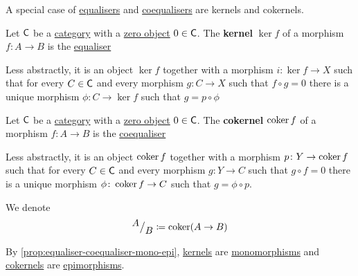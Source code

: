 \documentclass[../../main]{subfiles}
\begin{document}
A special case of \hyperref[def:equaliser]{equalisers} and \hyperref[def:coequaliser]{coequalisers} are kernels and cokernels.

\begin{definition}[Kernel]\label{def:categorical-kernel}
  Let \(\mathsf{C}\) be a \hyperref[def:category]{category} with a \hyperref[def:zero-object]{zero object} \(0 \in \mathsf{C}\).
  The \textbf{kernel} \(\ker f\) of a morphism \(f\colon A \to B\) is the \hyperref[def:equaliser]{equaliser}
  \begin{center}
  \end{center}
  
  Less abstractly, it is an object \(\ker f\) together with a morphism \(i\colon \ker f \to X\) such that for every \(C \in \mathsf{C}\) and every morphism \(g\colon C \to X\) such that \(f \circ g = 0\) there is a unique morphism \(\phi\colon C \to \ker f\) such that \(g = p \circ \phi\)
\end{definition}

\begin{definition}[Cokernel]\label{def:categorical-cokernel}
  Let \(\mathsf{C}\) be a \hyperref[def:category]{category} with a \hyperref[def:zero-object]{zero object} \(0 \in \mathsf{C}\).
  The \textbf{cokernel} \(\operatorname*{coker} f\) of a morphism \(f\colon A \to B\) is the \hyperref[def:coequaliser]{coequaliser}
  \begin{center}
  \end{center}
  
  Less abstractly, it is an object \(\operatorname*{coker} f\) together with a morphism \(p\colon Y \to \operatorname*{coker} f\) such that for every \(C \in \mathsf{C}\) and every morphism \(g\colon Y \to C\) such that \(g \circ f = 0\) there is a unique morphism \(\phi\colon \operatorname*{coker} f \to C\) such that \(g = \phi \circ p\).

  We denote
  \begin{equation*}
    {^{\textstyle A}\big/_{\textstyle B}} \coloneq \operatorname*{coker}(A \to B)
  \end{equation*}
\end{definition}

\begin{remark}
  By \autoref{prop:equaliser-coequaliser-mono-epi}, \hyperref[def:categorical-kernel]{kernels} are \hyperref[def:mono-epi-morphism]{monomorphisms} and \hyperref[def:categorical-cokernel]{cokernels} are \hyperref[def:mono-epi-morphism]{epimorphisms}.
\end{remark}
\end{document}
